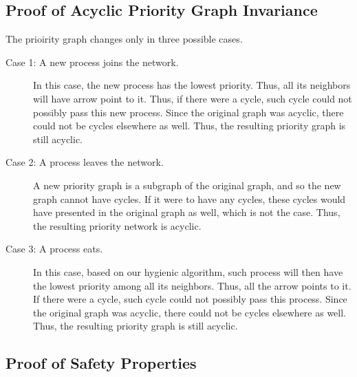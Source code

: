 \documentclass[11pt]{article}
\begin{document}
\subsection{Proof of Acyclic Priority Graph Invariance}
The prioirity graph changes only in three possible cases.
\begin{description}
\item[Case 1: A new process joins the network.] In this case, the new process has the lowest priority. Thus, all its neighbors will have arrow point to it. Thus, if there were a cycle, such cycle could not possibly pass this new process. Since the original graph was acyclic, there could not be cycles elsewhere as well. Thus, the resulting priority graph is still acyclic.
\item[Case 2: A process leaves the network.] A new priority graph is a subgraph of the original graph, and so the new graph cannot have cycles. If it were to have any cycles, these cycles would have presented in the original graph as well, which is not the case. Thus, the resulting priority network is acyclic.
\item[Case 3: A process eats.] In this case, based on our hygienic algorithm, such process will then have the lowest priority among all its neighbors. Thus, all the arrow points to it. If there were a cycle, such cycle could not possibly pass this process. Since the original graph was acyclic, there could not be cycles elsewhere as well. Thus, the resulting priority graph is still acyclic.
\end{description}

\subsection{Proof of Safety Properties}
\end{document}

